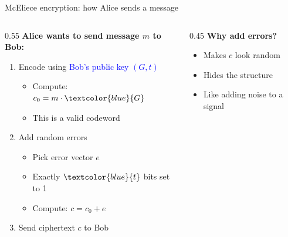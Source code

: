 \ifdefined\PRESENTATION\else\PassOptionsToClass{handout}{beamer}\fi\documentclass[aspectratio=169, lualatex]{beamer}
\begin{document}
\begin{frame}{McEliece encryption: how Alice sends a message}
	\begin{columns}[c]
		\begin{column}{0.55\textwidth}
			\textbf{Alice wants to send message $m$ to Bob:}
			\begin{enumerate}
				\item Encode using \textcolor{blue}{Bob's public key $(G, t)$}
				      \begin{itemize}
					      \item Compute: $c_0 = m \cdot \textcolor{blue}{G}$
					      \item This is a valid codeword
				      \end{itemize}
				\item Add random errors
				      \begin{itemize}
					      \item Pick error vector $e$
					      \item Exactly $\textcolor{blue}{t}$ bits set to 1
					      \item Compute: $c = c_0 + e$
				      \end{itemize}
				\item Send ciphertext $c$ to Bob
			\end{enumerate}
		\end{column}
		\begin{column}{0.45\textwidth}
			\textbf{Why add errors?}
			\begin{itemize}
				\item Makes $c$ look random
				\item Hides the structure
				\item Like adding noise to a signal
			\end{itemize}
		\end{column}
	\end{columns}
\end{frame}
\end{document}
